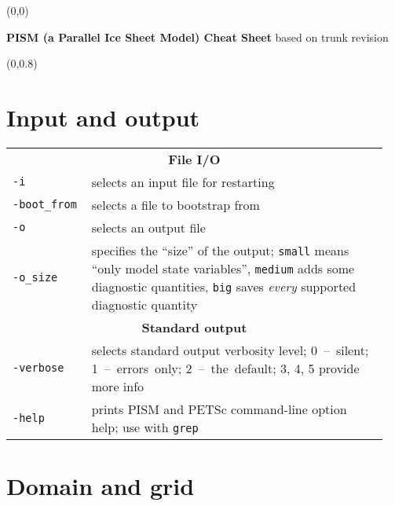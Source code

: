\documentclass[landscape]{article}
\newcommand{\PISMREV}{trunk revision }
\newcommand{\tabletitle}[1]{\multicolumn{2}{c}{\textbf{#1}}}
\begin{document}
\pagestyle{empty}

\begin{textblock}{47}(0,0)
  \begin{center}
    \Large{\textbf{PISM (a Parallel Ice Sheet Model) Cheat Sheet} based on \PISMREV}
  \end{center}
\end{textblock}

\begin{textblock}{15}(0,0.8)
\section{Input and output}
\label{sec:input-output}

\begin{tabular}{@{}p{0.2\linewidth}p{0.75\linewidth}@{}}
\tabletitle{File I/O} \\
\texttt{-i} & selects an input file for restarting \\
\texttt{-boot_from} & selects a file to bootstrap from \\
\texttt{-o} & selects an output file \\
\texttt{-o_size} & specifies the ``size'' of the output; \texttt{small} means
``only model state variables'', \texttt{medium} adds some
diagnostic quantities, \texttt{big} saves \emph{every} supported diagnostic quantity\\
\tabletitle{Standard output} \\
\texttt{-verbose} & selects standard output verbosity level; \mbox{0 -- silent}; \mbox{1 --
errors only}; \mbox{2 -- the default}; 3, 4, 5 provide more info\\
\texttt{-help} & prints PISM and PETSc command-line option help; use with \texttt{grep}\\
\end{tabular}

\section{Domain and grid}
\label{sec:grid-setup}
  

\end{textblock}
\end{document}
